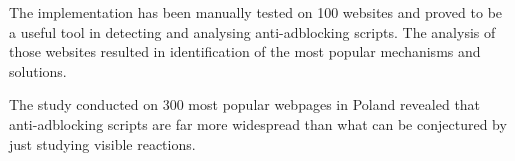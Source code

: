 The implementation has been manually tested on 100 websites and proved to be a useful tool 
in detecting and analysing anti-adblocking scripts. The analysis of those websites
resulted in identification of the most popular mechanisms and solutions.

The study conducted on 300 most popular webpages in Poland revealed that anti-adblocking scripts
are far more widespread than what can be conjectured by just studying visible reactions.

